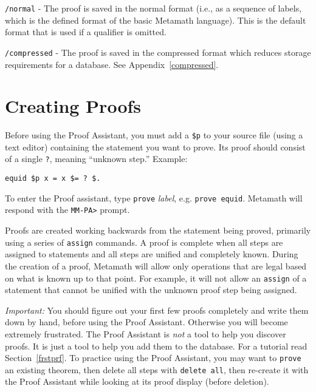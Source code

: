     \texttt{/normal} - The proof is saved in the normal format (i.e., as a
        sequence
        of labels, which is the defined format of the basic Metamath
        language).  This is the default format that
        is used if a qualifier
        is omitted.

    \texttt{/compressed} - The proof is saved in the compressed format which
        reduces storage requirements for a database.
        See Appendix~\ref{compressed}.




\section{Creating Proofs}\label{pfcommands}

Before using the Proof Assistant, you must add a \texttt{\$p} to your
source file (using a text editor) containing the statement you want to
prove.  Its proof should consist of a single \texttt{?}, meaning
``unknown step.''  Example:
\begin{verbatim}
equid $p x = x $= ? $.
\end{verbatim}

To enter the Proof assistant, type \texttt{prove} {\em label}, e.g.
\texttt{prove equid}.  Metamath will respond with the \texttt{MM-PA>}
prompt.

Proofs are created working backwards from the statement being proved,
primarily using a series of \texttt{assign} commands.  A proof is
complete when all steps are assigned to statements and all steps are
unified and completely known.  During the creation of a proof, Metamath
will allow only operations that are legal based on what is known up to
that point.  For example, it will not allow an \texttt{assign} of a
statement that cannot be unified with the unknown proof step being
assigned.

{\em Important:} You should figure out your first few proofs completely
and write them down by hand, before using the Proof Assistant.
Otherwise you will become extremely frustrated.  The Proof Assistant is
{\em not} a tool to help you discover proofs.  It is just a tool to help
you add them to the database.  For a tutorial read
Section~\ref{frstprf}.  To practice using the Proof Assistant, you may
want to \texttt{prove} an existing theorem, then delete all steps with
\texttt{delete all}, then re-create it with the Proof Assistant while
looking at its proof display (before deletion).

